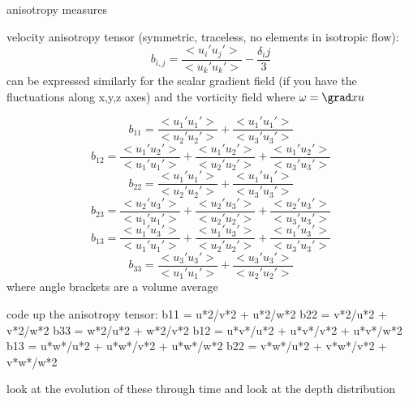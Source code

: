 anisotropy measures

velocity anisotropy tensor (symmetric, traceless, no elements in isotropic flow):
\begin{equation}
	b_{i,j} = \frac{<u_i'u_j'>}{<u_k'u_k'>} - \frac{\delta_ij}{3}
\end{equation}
can be expressed similarly for the scalar gradient field (if you have the fluctuations along x,y,z axes)
and the vorticity field where $\omega = \grad x u$

\begin{equation}
b_{11} = \frac{<u_1'u_1'>}{<u_2'u_2'>} 
+ \frac{<u_1'u_1'>}{<u_3'u_3'>} 
\end{equation}
\begin{equation}
	b_{12} = \frac{<u_1'u_2'>}{<u_1'u_1'>} 
	              + \frac{<u_1'u_2'>}{<u_2'u_2'>} 
	              + \frac{<u_1'u_2'>}{<u_3'u_3'>}
\end{equation}
\begin{equation}
b_{22} =  \frac{<u_1'u_1'>}{<u_2'u_2'>} 
+ \frac{<u_1'u_1'>}{<u_3'u_3'>}
\end{equation}
\begin{equation}
b_{23} = \frac{<u_2'u_3'>}{<u_1'u_1'>} 
+ \frac{<u_2'u_3'>}{<u_2'u_2'>} 
+ \frac{<u_2'u_3'>}{<u_3'u_3'>}
\end{equation}
\begin{equation}
b_{13} = \frac{<u_1'u_3'>}{<u_1'u_1'>} 
+ \frac{<u_1'u_3'>}{<u_2'u_2'>} 
+ \frac{<u_1'u_3'>}{<u_3'u_3'>}
\end{equation}
\begin{equation}
b_{33} = \frac{<u_3'u_3'>}{<u_1'u_1'>} 
+ \frac{<u_3'u_3'>}{<u_2'u_2'>} 
\end{equation}
where angle brackets are a volume average

code up the anisotropy tensor:
b11 = u*2/v*2 + u*2/w*2
b22 = v*2/u*2 + v*2/w*2
b33 = w*2/u*2 + w*2/v*2
b12 = u*v*/u*2 + u*v*/v*2 + u*v*/w*2
b13 = u*w*/u*2 + u*w*/v*2 + u*w*/w*2
b22 = v*w*/u*2 + v*w*/v*2 + v*w*/w*2

look at the evolution of these through time
and look at the depth distribution
